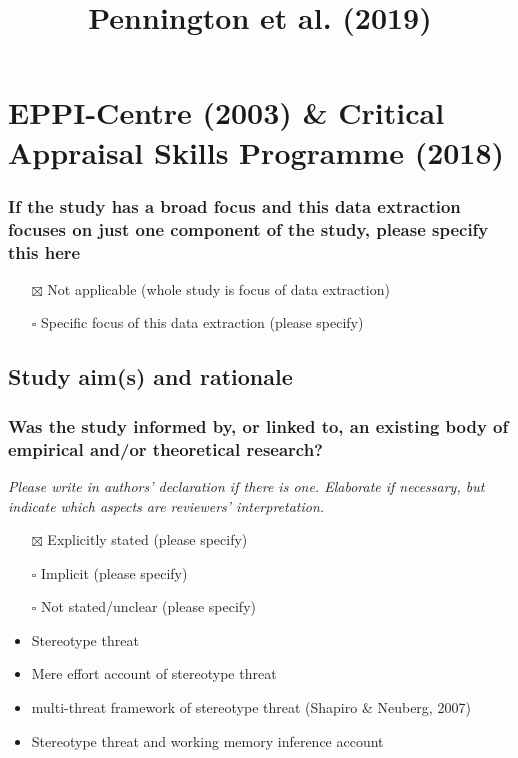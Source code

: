 \documentclass[
  doc, a4paper]{apa7}
\title{Pennington et al. (2019)}
\author{\phantom{0}}
\date{}
\affiliation{\phantom{0}}
\providecommand{\tightlist}{%
  \setlength{\itemsep}{0pt}\setlength{\parskip}{0pt}}
\begin{document}
\maketitle

\section{EPPI-Centre (2003) \& Critical Appraisal Skills Programme (2018)}\label{eppi-centrereviewguidelinesextracting2003-criticalappraisalskillsprogrammecaspsystematicreview2018}

\subsubsection{If the study has a broad focus and this data extraction focuses on just one component of the study, please specify this here}\label{if-the-study-has-a-broad-focus-and-this-data-extraction-focuses-on-just-one-component-of-the-study-please-specify-this-here}

\begin{itemize}
\tightlist
\item[$\boxtimes$]
  Not applicable (whole study is focus of data extraction)\\
\item[$\square$]
  Specific focus of this data extraction (please specify)
\end{itemize}

\subsection{Study aim(s) and rationale}\label{study-aims-and-rationale}

\subsubsection{Was the study informed by, or linked to, an existing body of empirical and/or theoretical research?}\label{was-the-study-informed-by-or-linked-to-an-existing-body-of-empirical-andor-theoretical-research}

\emph{Please write in authors' declaration if there is one. Elaborate if necessary, but indicate which aspects are reviewers' interpretation.}

\begin{itemize}
\item[$\boxtimes$]
  Explicitly stated (please specify)\\
\item[$\square$]
  Implicit (please specify)\\
\item[$\square$]
  Not stated/unclear (please specify)
\item
  Stereotype threat
\item
  Mere effort account of stereotype threat
\item
  multi-threat framework of stereotype threat (Shapiro \& Neuberg, 2007)
\item
  Stereotype threat and working memory inference account
\end{itemize}
\end{document}
